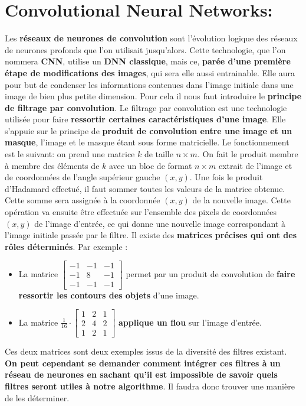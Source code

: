 \documentclass[12pt,a4paper]{extarticle}
\begin{document}
\section{Convolutional Neural Networks:}
Les \textbf{réseaux de neurones de convolution} \cite{cnn} sont l'évolution logique des réseaux de neurones profonds que l'on utilisait jusqu'alors. Cette technologie, que l'on nommera \textbf{CNN}, utilise un \textbf{DNN classique}, mais ce, \textbf{parée d'une première étape de modifications des images}, qui sera elle aussi entrainable. Elle aura pour but de condenser les informations contenues dans l'image initiale dans une image de bien plus petite dimension. Pour cela il nous faut introduire le \textbf{principe de filtrage par convolution}. Le filtrage par convolution est une technologie utilisée pour faire \textbf{ressortir certaines caractéristiques d'une image}. Elle s'appuie sur le principe de \textbf{produit de convolution entre une image et un masque}, l'image et le masque étant sous forme matricielle. Le fonctionnement est le suivant: on prend une matrice $k$ de taille $n \times m$. On fait le produit membre à membre des éléments de $k$ avec un bloc de format $n\times m$ extrait de l'image et de coordonnées de l'angle supérieur gauche $(x,y)$. Une fois le produit d'Hadamard effectué, il faut sommer toutes les valeurs de la matrice obtenue. Cette somme sera assignée à la coordonnée $(x,y)$ de la nouvelle image. Cette opération va ensuite être effectuée sur l'ensemble des pixels de coordonnées $(x,y)$ de l'image d'entrée, ce qui donne une nouvelle image correspondant à l'image initiale passée par le filtre. Il existe des \textbf{matrices précises qui ont des rôles déterminés}. Par exemple :
\begin{itemize}
\item La matrice 
$\begin{bmatrix} 
-1 & -1 & -1 \\
-1 & 8 & -1 \\
-1 & -1 & -1  
\end{bmatrix}$ permet par un produit de convolution de \textbf{faire ressortir les contours des objets} d'une image.
\item La matrice
$\frac{1}{16}\cdot \begin{bmatrix}
1 & 2 & 1 \\
2 & 4 & 2 \\
1 & 2 & 1 
\end{bmatrix}$ \textbf{applique un flou} sur l'image d'entrée.
\end{itemize}
Ces deux matrices sont deux exemples issus de la diversité des filtres existant. \textbf{On peut cependant se demander comment intégrer ces filtres à un réseau de neurones en sachant qu'il est impossible de savoir quels filtres seront utiles à notre algorithme}. Il faudra donc trouver une manière de les déterminer.
\end{document}
